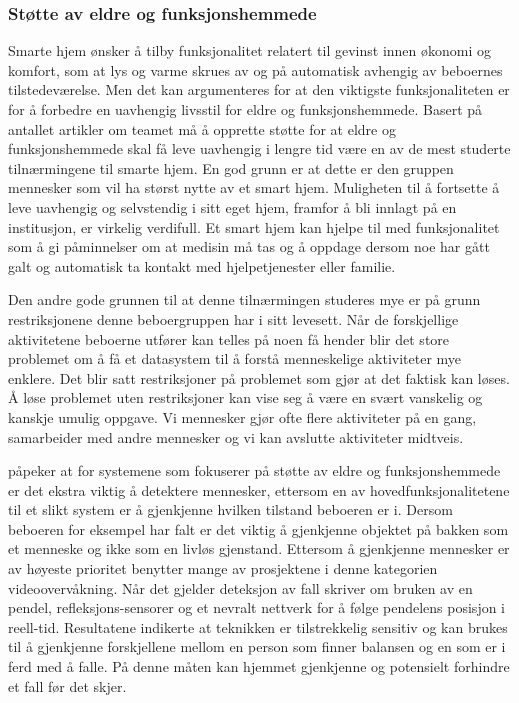 \subsubsection*{Støtte av eldre og funksjonshemmede}
Smarte hjem ønsker å tilby funksjonalitet relatert til gevinst innen økonomi og komfort, som at lys og varme skrues av og på automatisk avhengig av beboernes tilstedeværelse. Men det kan argumenteres for at den viktigste funksjonaliteten er for å forbedre en uavhengig livsstil for eldre og funksjonshemmede. Basert på antallet artikler om teamet må å opprette støtte for at eldre og funksjonshemmede skal få leve uavhengig i lengre tid være en av de mest studerte tilnærmingene til smarte hjem. En god grunn er at dette er den gruppen mennesker som vil ha størst nytte av et smart hjem. Muligheten til å fortsette å leve uavhengig og selvstendig i sitt eget hjem, framfor å bli innlagt på en institusjon, er virkelig verdifull. Et smart hjem kan hjelpe til med funksjonalitet som å gi påminnelser om at medisin må tas og å oppdage dersom noe har gått galt og automatisk ta kontakt med hjelpetjenester eller familie.

Den andre gode grunnen til at denne tilnærmingen studeres mye er på grunn restriksjonene denne beboergruppen har i sitt levesett. Når de forskjellige aktivitetene beboerne utfører kan telles på noen få hender blir det store problemet om å få et datasystem til å forstå menneskelige aktiviteter mye enklere. Det blir satt restriksjoner på problemet som gjør at det faktisk kan løses. Å løse problemet uten restriksjoner kan vise seg å være en svært vanskelig og kanskje umulig oppgave. Vi mennesker gjør ofte flere aktiviteter på en gang, samarbeider med andre mennesker og vi kan avslutte aktiviteter midtveis.


\citet{desilva12} påpeker at for systemene som fokuserer på støtte av eldre og funksjonshemmede er det ekstra viktig å detektere mennesker, ettersom en av hovedfunksjonalitetene til et slikt system er å gjenkjenne hvilken tilstand beboeren er i. Dersom beboeren for eksempel har falt er det viktig å gjenkjenne objektet på bakken som et menneske og ikke som en livløs gjenstand. Ettersom å gjenkjenne mennesker er av høyeste prioritet benytter mange av prosjektene i denne kategorien videoovervåkning. Når det gjelder deteksjon av fall skriver \citet{elliot09} om bruken av en pendel, refleksjons-sensorer og et nevralt nettverk for å følge pendelens posisjon i reell-tid. Resultatene indikerte at teknikken er tilstrekkelig sensitiv og kan brukes til å gjenkjenne forskjellene mellom en person som finner balansen og en som er i ferd med å falle. På denne måten kan hjemmet gjenkjenne og potensielt forhindre et fall før det skjer.

